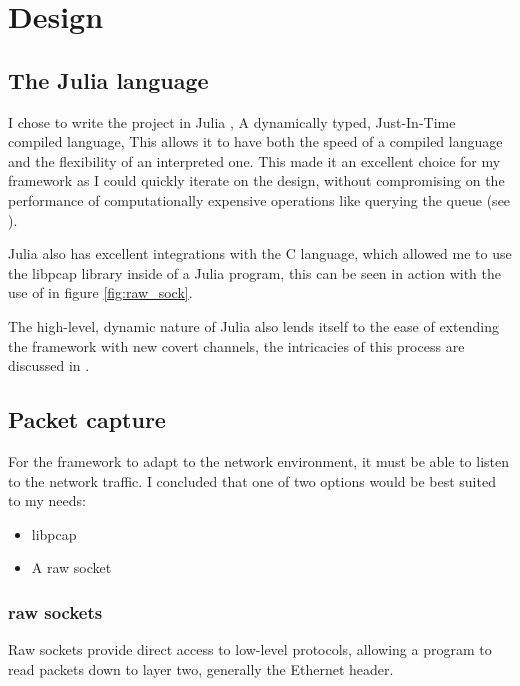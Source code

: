 \chapter{Design}
\label{ch:design}

\section{The Julia language}

I chose to write the project in Julia \citep{julia}, A dynamically typed, Just-In-Time compiled language, This allows it to have both the speed of a compiled language and the flexibility of an interpreted one. This made it an excellent choice for my framework as I could quickly iterate on the design, without compromising on the performance of computationally expensive operations like querying the queue (see ).

Julia also has excellent integrations with the C language, which allowed me to use the libpcap library \citep{libpcap} inside of a Julia program, this can be seen in action with the use of  in figure \ref{fig:raw_sock}.

The high-level, dynamic nature of Julia also lends itself to the ease of extending the framework with new covert channels, the intricacies of this process are discussed in .

\section{Packet capture}
\label{sec:packet_capture}

For the framework to adapt to the network environment, it must be able to listen to the network traffic.
I concluded that one of two options would be best suited to my needs:

\begin{itemize}
    \item libpcap
    \item A raw socket
\end{itemize}

\subsection{raw sockets}

Raw sockets provide direct access to low-level protocols, allowing a program to read packets down to layer two, generally the Ethernet header. 

